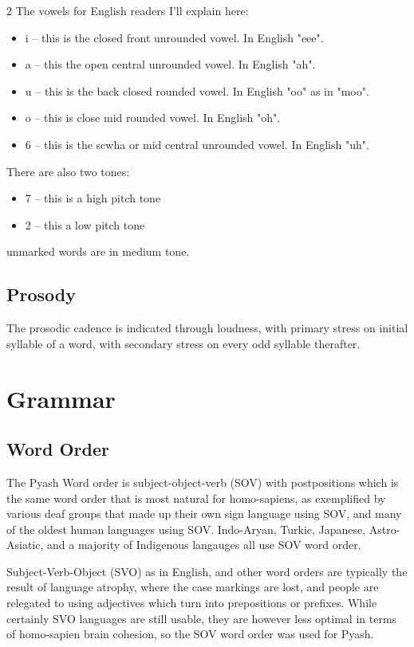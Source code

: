\documentclass[10pt,pagesize]{article}
\providecommand{\tightlist}{%
  \setlength{\itemsep}{0pt}\setlength{\parskip}{0pt}}
\begin{document}
\begin{multicols}{2}
The vowels for English readers I'll explain here:
  \begin{itemize}\tightlist
    \item i -- this is the closed front unrounded vowel. In English "eee".
    \item a -- this the open central unrounded vowel. In English "ah". 
    \item u -- this is the back closed rounded vowel. In English "oo" as in "moo". 
    \item o -- this is close mid rounded vowel. In English "oh". 
    \item 6 -- this is the scwha or mid central unrounded vowel. In English "uh".
  \end{itemize}
There are also two tones:
  \begin{itemize}\tightlist
    \item 7 -- this is a high pitch tone
    \item 2 -- this a low pitch tone
  \end{itemize}
unmarked words are in medium tone. 

\subsection{Prosody}

The prosodic cadence is indicated through loudness, with primary stress on initial syllable of a word, with secondary stress on every odd syllable therafter.

\section{Grammar}
  \subsection{Word Order}
  The Pyash Word order is subject-object-verb (SOV) with postpositions 
  which is the same word order that is most natural for homo-sapiens, 
  as exemplified by various deaf groups that made up their own sign language 
  using SOV, and many of the oldest human languages using SOV. Indo-Aryan, 
  Turkic, Japanese, Astro-Asiatic, and a majority of Indigenous langauges all 
  use SOV word order. 

  Subject-Verb-Object (SVO) as in English, and other word 
  orders are typically the result of 
  language atrophy, where the case markings are lost, and people are relegated
  to using adjectives which turn into prepositions or prefixes.  While certainly
  SVO languages are still usable, they are however less optimal in terms of
  homo-sapien brain cohesion, so the SOV word order was used for Pyash. 


\end{multicols}
\end{document}
